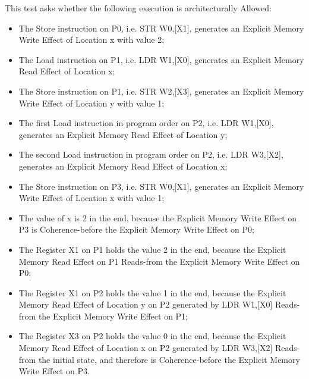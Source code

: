 This test asks whether the following execution is architecturally Allowed:

\begin{itemize}
  \item The Store instruction on P0, i.e. STR W0,[X1], generates an Explicit Memory Write Effect of Location x with value 2;
  \item The Load instruction on P1, i.e. LDR W1,[X0], generates an Explicit Memory Read Effect of Location x;
  \item The Store instruction on P1, i.e. STR W2,[X3], generates an Explicit Memory Write Effect of Location y with value 1;
  \item The first Load instruction in program order on P2, i.e. LDR W1,[X0], generates an Explicit Memory Read Effect of Location y;
  \item The second Load instruction in program order on P2, i.e. LDR W3,[X2], generates an Explicit Memory Read Effect of Location x;
  \item The Store instruction on P3, i.e. STR W0,[X1], generates an Explicit Memory Write Effect of Location x with value 1;
  \item The value of x is 2 in the end, because the Explicit Memory Write Effect on P3 is Coherence-before the Explicit Memory Write Effect on P0;
  \item The Register X1 on P1 holds the value 2 in the end, because the Explicit Memory Read Effect on P1 Reads-from the Explicit Memory Write Effect on P0;
  \item The Register X1 on P2 holds the value 1 in the end, because the Explicit Memory Read Effect of Location y on P2 generated by LDR W1,[X0] Reads-from the Explicit Memory Write Effect on P1;
  \item The Register X3 on P2 holds the value 0 in the end, because the Explicit Memory Read Effect of Location x on P2 generated by LDR W3,[X2] Reads-from the initial state, and therefore is Coherence-before the Explicit Memory Write Effect on P3.
\end{itemize}
